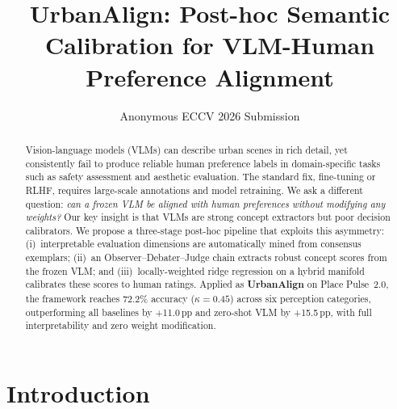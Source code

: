 \documentclass[runningheads]{llncs}
\begin{document}
\title{UrbanAlign: Post-hoc Semantic Calibration for VLM-Human Preference Alignment}


\author{Anonymous ECCV 2026 Submission}

\maketitle

\begin{abstract}
Vision-language models (VLMs) can describe urban scenes in rich detail, yet consistently fail to produce reliable human preference labels in domain-specific tasks such as safety assessment and aesthetic evaluation.
The standard fix, fine-tuning or RLHF, requires large-scale annotations and model retraining.
We ask a different question: \emph{can a frozen VLM be aligned with human preferences without modifying any weights?}
Our key insight is that VLMs are strong concept extractors but poor decision calibrators.
We propose a three-stage post-hoc pipeline that exploits this asymmetry: (i)~interpretable evaluation dimensions are automatically mined from consensus exemplars; (ii)~an Observer--Debater--Judge chain extracts robust concept scores from the frozen VLM; and (iii)~locally-weighted ridge regression on a hybrid manifold calibrates these scores to human ratings.
Applied as \textbf{UrbanAlign} on Place Pulse~2.0, the framework reaches 72.2\% accuracy ($\kappa{=}0.45$) across six perception categories, outperforming all baselines by +11.0\,pp and zero-shot VLM by +15.5\,pp, with full interpretability and zero weight modification.

\end{abstract}


\section{Introduction}
\label{sec:intro}
\end{document}
